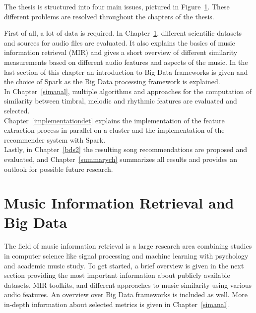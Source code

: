 \noindent The thesis is structured into four main issues, pictured in Figure~\ref{structh}. These different problems are resolved throughout the chapters of the thesis.

\begin{figure}[htbp]
	\centering
	\label{structh}
\end{figure}

\noindent First of all, a lot of data is required. In Chapter~\ref{audiofeat}, different scientific datasets and sources for audio files are evaluated. It also explains the basics of music information retrieval (MIR) and gives a short overview of different similarity measurements based on different audio features and aspects of the music. In the last section of this chapter an introduction to Big Data frameworks is given and the choice of Spark as the Big Data processing framework is explained.\\
In Chapter~\ref{simanal}, multiple algorithms and approaches for the computation of similarity between timbral, melodic and rhythmic features are evaluated and selected.\\
Chapter~\ref{implementationdet} explains the implementation of the feature extraction process in parallel on a cluster and the implementation of the recommender system with Spark.\\
Lastly, in Chapter~\ref{bds2} the resulting song recommendations are proposed and evaluated, and Chapter~\ref{summarych} summarizes all results and provides an outlook for possible future research. 


\chapter{Music Information Retrieval and Big Data}\label{audiofeat}

The field of music information retrieval is a large research area combining studies in computer science like signal processing and machine learning with psychology and academic music study. To get started, a brief overview is given in the next section providing the most important information about publicly available datasets, MIR toolkits, and different approaches to music similarity using various audio features. An overview over Big Data frameworks is included as well. More in-depth information about selected metrics is given in Chapter~\ref{simanal}. 

